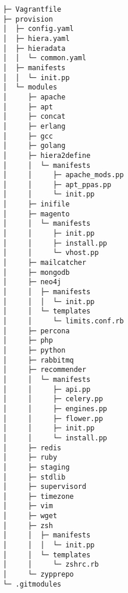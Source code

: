 \begin{codebox}
\begin{verbatim}
├─ Vagrantfile
├─ provision
│  ├─ config.yaml
│  ├─ hiera.yaml
│  ├─ hieradata
│  │  └─ common.yaml
│  ├─ manifests
│  │  └─ init.pp
│  └─ modules
│     ├─ apache
│     ├─ apt
│     ├─ concat
│     ├─ erlang
│     ├─ gcc
│     ├─ golang
│     ├─ hiera2define
│     │  └─ manifests
│     │     ├─ apache_mods.pp
│     │     ├─ apt_ppas.pp
│     │     └─ init.pp
│     ├─ inifile
│     ├─ magento
│     │  └─ manifests
│     │     ├─ init.pp
│     │     ├─ install.pp
│     │     └─ vhost.pp
│     ├─ mailcatcher
│     ├─ mongodb
│     ├─ neo4j
│     │  ├─ manifests
│     │  │  └─ init.pp
│     │  └─ templates
│     │     └─ limits.conf.rb
│     ├─ percona
│     ├─ php
│     ├─ python
│     ├─ rabbitmq
│     ├─ recommender
│     │  └─ manifests
│     │     ├─ api.pp
│     │     ├─ celery.pp
│     │     ├─ engines.pp
│     │     ├─ flower.pp
│     │     ├─ init.pp
│     │     └─ install.pp
│     ├─ redis
│     ├─ ruby
│     ├─ staging
│     ├─ stdlib
│     ├─ supervisord
│     ├─ timezone
│     ├─ vim
│     ├─ wget
│     ├─ zsh
│     │  ├─ manifests
│     │  │  └─ init.pp
│     │  └─ templates
│     │     └─ zshrc.rb
│     └─ zypprepo
└─ .gitmodules

\end{verbatim}
\end{codebox}

